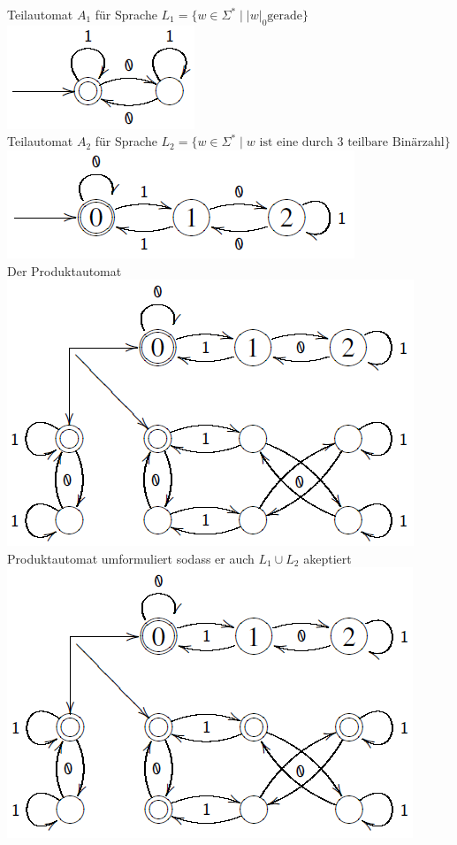 \documentclass[a4paper]{article}
\begin{document}
	\begin{falgo}
		Teilautomat $A_1$ für Sprache $L_1 = \{w \in \Sigma^* \mid |w|_0 \text{gerade}\}$ \\
		\includegraphics[scale=0.6]{produktautomat_1.png} \\
		Teilautomat $A_2$ für Sprache $L_2 = \{w \in \Sigma^* \mid w \text{ ist eine durch 3 teilbare Binärzahl} \}$ \\
		\includegraphics[scale=0.6]{produktautomat_2.png} \\
		Der Produktautomat \\
		\includegraphics[scale=0.6]{produktautomat_3.png} \\
		Produktautomat umformuliert sodass er auch $L_1 \cup L_2$ akeptiert \\
		\includegraphics[scale=0.6]{produktautomat_4.png}
	\end{falgo}
\end{document}
